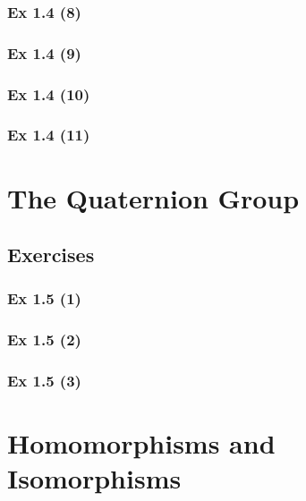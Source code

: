 \subsubsection{Ex 1.4 (8)}\label{sec:Ex_1.4.8}

\subsubsection{Ex 1.4 (9)}\label{sec:Ex_1.4.9}

\subsubsection{Ex 1.4 (10)}\label{sec:Ex_1.4.10}

\subsubsection{Ex 1.4 (11)}\label{sec:Ex_1.4.11}

\newpage		%

\section{The Quaternion Group}\label{sec:1.5}
\subsection*{Exercises}\label{sec:1.5_Exercises}

\subsubsection{Ex 1.5 (1)}\label{sec:Ex_1.5.1}

\subsubsection{Ex 1.5 (2)}\label{sec:Ex_1.5.2}

\subsubsection{Ex 1.5 (3)}\label{sec:Ex_1.5.3}

\newpage		%

\section{Homomorphisms and Isomorphisms}\label{sec:1.6}	
